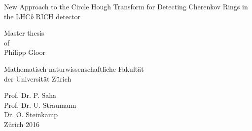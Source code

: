 \documentclass[10pt, a4paper]{article}
\begin{document}
\begin{titlepage}
  \vspace{1cm}

  \Huge\centering New Approach to the Circle Hough Transform for Detecting
        Cherenkov Rings in the LHC\textit{b} RICH detector 


  
  \noindent{\rule{\textwidth}{0.4pt}}

\vspace{1cm}

{\centering
  \Large Master thesis\\
  of\\
  Philipp Gloor
  \vspace{1.5cm}

  \Large Mathematisch-naturwissenschaftliche Fakultät\\
  der Universität Zürich
  \vspace{2cm}

  \Large 
  Prof. Dr. P. Saha\\
  Prof. Dr. U. Straumann\\
  Dr. O. Steinkamp\\
  \vspace{\fill}
  \Large Zürich 2016
}
\end{titlepage}
\end{document}
